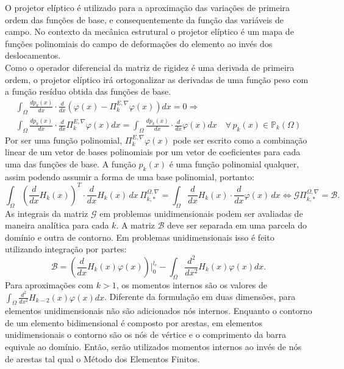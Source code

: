 \indent O projetor elíptico é utilizado para a aproximação das variações de primeira ordem das funções de base, e consequentemente da função das variáveis de campo. No contexto da mecânica estrutural o projetor elíptico é um mapa de funções polinomiais do campo de deformações do elemento ao invés dos deslocamentos. \\
\indent Como o operador diferencial da matriz de rigidez é uma derivada de primeira ordem, o projetor elíptico irá ortogonalizar as derivadas de uma função peso com a função resíduo obtida das funções de base.
\begin{equation}
    \begin{split}
        \int_{\Omega} \frac{d p_k(x)}{dx} \cdot \frac{d}{dx} \left( \varphi(x) - \Pi_k^{E,\nabla}\varphi(x) \right) dx = 0 \Rightarrow \\ 
        \int_{\Omega} \frac{d p_k(x)}{dx} \cdot \frac{d}{dx} \Pi_k^{E,\nabla}\varphi(x) dx = \int_{\Omega} \frac{d p_k(x)}{dx} \cdot \frac{d}{dx}\varphi(x)  dx \quad \forall \, p_k(x) \in \mathbb{P}_k(\Omega) 
    \end{split}
\end{equation}
\indent Por ser uma função polinomial, $\Pi_k^{E,\nabla}\varphi(x)$ pode ser escrito como a combinação linear de um vetor de bases polinomiais por um vetor de coeficientes para cada uma das funções de base. A função $p_k(x)$ é uma função polinomial qualquer, assim podendo assumir a forma de uma base polinomial, portanto:
\begin{equation}
     \int_{\Omega} \left(\frac{d}{dx} H_k(x)\right)^T \cdot \frac{d}{dx} H_k(x) \, dx \, \Pi_{k,*}^{\Omega,\nabla} = \int_{\Omega} \frac{d}{dx}H_k(x) \cdot \frac{d}{dx}\varphi(x) \, dx \Leftrightarrow \mathcal{G} \Pi_{k,*}^{\Omega,\nabla} = \mathcal{B}.
\end{equation}
\indent As integrais da matriz $\mathcal{G}$ em problemas unidimensionais podem ser avaliadas de maneira analítica para cada $k$. A matriz $\mathcal{B}$ deve ser separada em uma parcela do domínio e outra de contorno. Em problemas unidimensionais isso é feito utilizando integração por partes:
\begin{equation}
    \mathcal{B} = \left(\frac{d}{dx} H_k(x)\varphi(x)\right)\Big|_{0}^{l_e} - \int_{\Omega} \frac{d^2}{dx^2}H_k(x) \varphi(x) dx.
\end{equation}
Para aproximações com $k > 1$, os momentos internos são os valores de $\int_{\Omega} \frac{d^2}{dx^2}H_{k-2}(x) \varphi(x) dx$. 
\indent Diferente da formulação em duas dimensões, para elementos unidimensionais não são adicionados nós internos. Enquanto o contorno de um elemento bidimensional é composto por arestas, em elementos unidimensionais o contorno são os nós de vértice e o comprimento da barra equivale ao domínio. Então, serão utilizados momentos internos ao invés de nós de arestas tal qual o Método dos Elementos Finitos.\\
